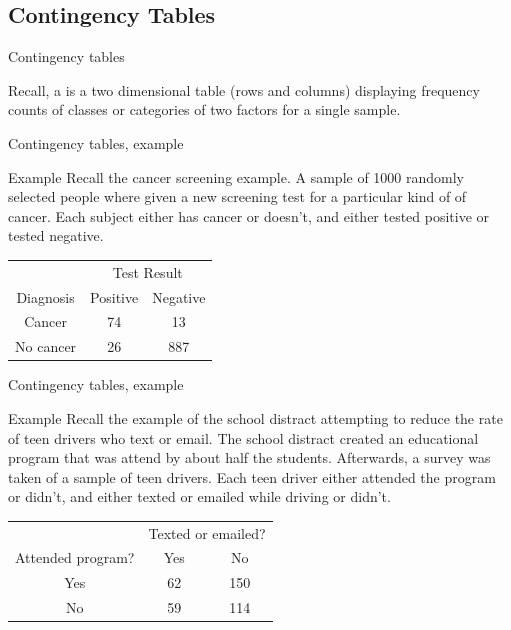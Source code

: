 \documentclass[xcolor=table]{beamer}
\begin{document}
\subsection{Contingency Tables}

\begin{frame}{Contingency tables}
\begin{block}{}
\large
Recall, a  is a two dimensional table (rows and columns) displaying frequency counts of classes or categories of two factors for a single sample.
\end{block}
\end{frame}

\begin{frame}{Contingency tables, example}
\begin{exampleblock}{Example}
Recall the cancer screening example. A sample of 1000 randomly selected people where given a new screening test for a particular kind of of cancer. Each subject either has cancer or doesn't, and either tested positive or tested negative.\\
\medskip
{\centering
\begin{tabular}{c | c  c}
\multicolumn{1}{c}{} & \multicolumn{2}{c}{Test Result}\\
Diagnosis & Positive & Negative\\
\hline
Cancer & 74 & 13\\
No cancer & 26 & 887 \\
\end{tabular}
\par}
\smallskip

\end{exampleblock}
\end{frame}

\begin{frame}{Contingency tables, example}
\begin{exampleblock}{Example}
Recall the example of the school distract attempting to reduce the rate of teen drivers who text or email. The school distract created an educational program that was attend by about half the students. Afterwards, a survey was taken of a sample of teen drivers. Each teen driver either attended the program or didn't, and either texted or emailed while driving or didn't.\\
\medskip
{\centering
\begin{tabular}{c | c  c}
\multicolumn{1}{c}{} & \multicolumn{2}{c}{Texted or emailed?}\\
Attended program? & Yes & No\\
\hline
Yes & 62 & 150\\
No & 59 & 114 \\
\end{tabular}
\par}
\smallskip

\end{exampleblock}
\end{frame}
\end{document}
